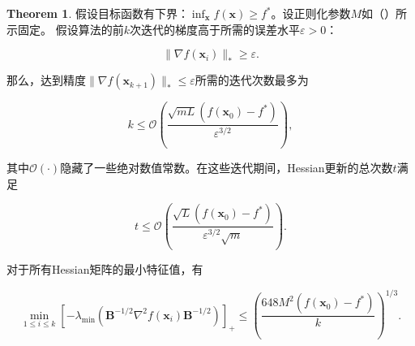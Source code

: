 \documentclass[a4paper,twoside,AutoFakeBold]{article}
\theoremstyle{definition}
\newtheorem{thrm2}{{Theorem}}[section]
\begin{document}
\begin{thrm2}\label{thrm:B.3}
假设目标函数有下界：\(\inf_{\mathbf{x}} f(\mathbf{x}) \geq f^*\)。设正则化参数\(M\)如（）所示固定。
假设算法的前\(k\)次迭代的梯度高于所需的误差水平\(\varepsilon > 0\)：

\begin{equation}\label{B.52}
\|\nabla f(\mathbf{x}_i)\|_* \geq \varepsilon. \tag{B.52}
\end{equation}

那么，达到精度\(\|\nabla f(\mathbf{x}_{k+1})\|_* \leq \varepsilon\)所需的迭代次数最多为

\begin{equation}\label{B.53}
k \leq \mathcal{O}\left( \frac{\sqrt{mL}(f(\mathbf{x}_0) - f^*)}{\varepsilon^{3/2}} \right), \tag{B.53}
\end{equation}

其中\(\mathcal{O}(\cdot)\)隐藏了一些绝对数值常数。在这些迭代期间，Hessian更新的总次数\(t\)满足

\begin{equation}\label{B.54}
t \leq \mathcal{O}\left( \frac{\sqrt{L}(f(\mathbf{x}_0) - f^*)}{\varepsilon^{3/2}\sqrt{m}} \right). \tag{B.54}
\end{equation}

对于所有Hessian矩阵的最小特征值，有

\begin{equation}\label{B.55}
\min_{1 \leq i \leq k} \left[ -\lambda_{\min} \left( \mathbf{B}^{-1/2} \nabla^2 f(\mathbf{x}_i) \mathbf{B}^{-1/2} \right) \right]_+ 
\leq \left( \frac{648M^2(f(\mathbf{x}_0) - f^*)}{k} \right)^{1/3}. \tag{B.55}
\end{equation}

\end{thrm2}
\end{document}
